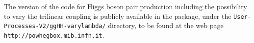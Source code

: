 The \powheg{} version of the code for Higgs boson pair production
including the possibility to vary the trilinear coupling is
publicly available in the  package, under the
{\tt User-Processes-V2/ggHH-varylambda/} directory, to be found
at the web page {\tt http://powhegbox.mib.infn.it}.
